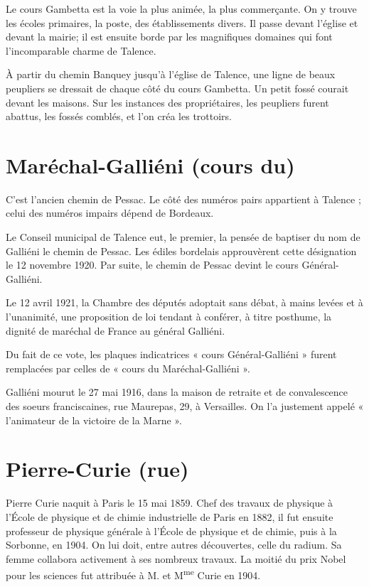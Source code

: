 \documentclass[a4paper,11pt]{book}
\begin{document}
Le cours Gambetta est la voie la plus animée, la plus commerçante. On y trouve les écoles primaires, la poste, des établissements divers. Il passe devant l'église et devant la mairie; il est ensuite borde par les magnifiques domaines qui font l'incomparable charme de Talence.

À partir du chemin Banquey jusqu'à l'église de Talence, une ligne de beaux peupliers se dressait de chaque côté du cours Gambetta. Un petit fossé courait devant les maisons. Sur les instances des propriétaires, les peupliers furent abattus, les fossés comblés, et l'on créa les trottoirs.

\section{Maréchal-Galliéni (cours du)}

C'est l'ancien chemin de Pessac. Le côté des numéros pairs appartient à Talence ; celui des numéros impairs dépend de Bordeaux.

Le Conseil municipal de Talence eut, le premier, la pensée de baptiser du nom de Galliéni le chemin de Pessac. Les édiles bordelais approuvèrent cette désignation le 12 novembre 1920. Par suite, le chemin de Pessac devint le cours Général-Galliéni.

Le 12 avril 1921, la Chambre des députés adoptait sans débat, à mains levées et à l'unanimité, une proposition de loi tendant à conférer, à titre posthume, la dignité de maréchal de France au général Galliéni.

Du fait de ce vote, les plaques indicatrices « cours Général-Galliéni » furent remplacées par celles de « cours du Maréchal-Galliéni ».

Galliéni mourut le 27 mai 1916, dans la maison de retraite et de convalescence des soeurs franciscaines, rue Maurepas, 29, à Versailles. On l'a justement appelé « l'animateur de la victoire de la Marne ».

\section{Pierre-Curie (rue)}

Pierre Curie naquit à Paris le 15 mai 1859. Chef des travaux de physique à l'École de physique et de chimie industrielle de Paris en 1882, il fut ensuite professeur de physique générale à l'École de physique et de chimie, puis à la Sorbonne, en 1904. On lui doit, entre autres découvertes, celle du radium. Sa femme collabora activement à ses nombreux travaux. La moitié du prix Nobel pour les sciences fut attribuée à M. et M\textsuperscript{me} Curie en 1904.
\end{document}
